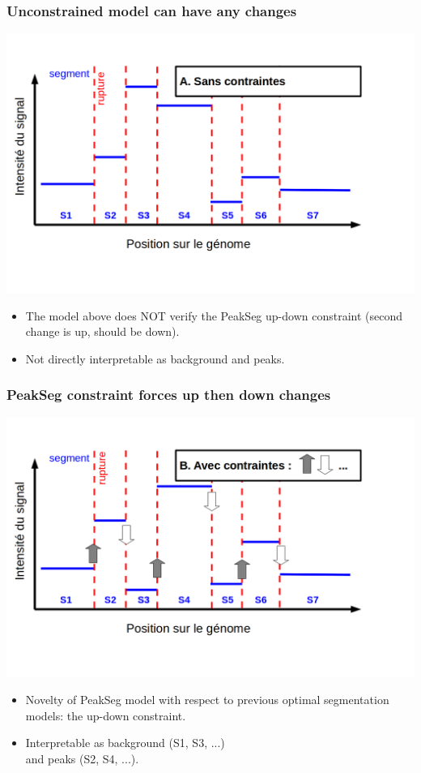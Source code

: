 \documentclass{beamer}
\begin{document}
\begin{frame}
  \frametitle{Unconstrained model can have any changes}
  \includegraphics[width=1\textwidth]{Seg_SansC.png}
  \vskip -1cm
  \begin{itemize}
  \item The model above does NOT verify the PeakSeg up-down constraint
    (second change is up, should be down).
  \item Not directly interpretable as background and peaks.
  \end{itemize}
\end{frame}

\begin{frame}
  \frametitle{PeakSeg constraint forces up then down changes}
  \includegraphics[width=1\textwidth]{Seg_AvecC1.png}
  \vskip -1cm
  \begin{itemize}
  \item Novelty of PeakSeg model with respect to previous optimal
    segmentation models: the up-down constraint.
  \item Interpretable as background (S1, S3, ...)\\
    and peaks (S2, S4, ...).
  \end{itemize}
\end{frame}
\end{document}
